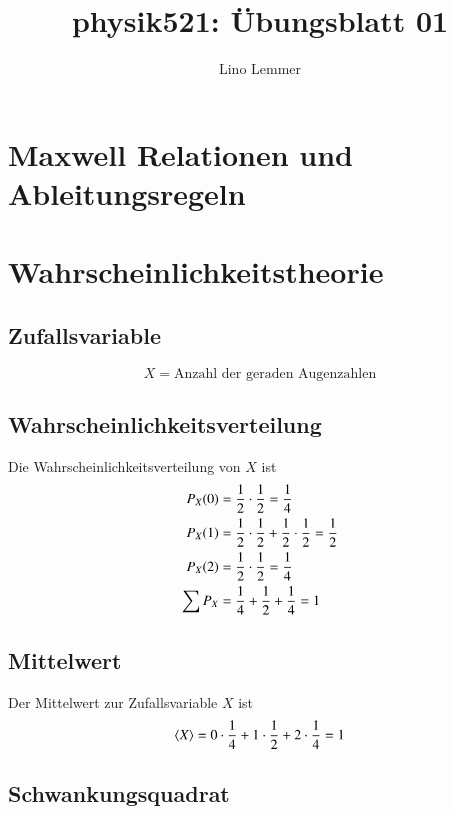 

\setcounter{section}{1}
\renewcommand\thesection{H\,1.\arabic{section}}
\renewcommand\thesubsection{\thesection.\alph{subsection}}

\title{physik521: Übungsblatt 01}
\author{Lino Lemmer}


\maketitle
\section{Maxwell Relationen und Ableitungsregeln}


\section{Wahrscheinlichkeitstheorie}

\subsection{Zufallsvariable}

\[
    X = \text{Anzahl der geraden Augenzahlen}
\]

\subsection{Wahrscheinlichkeitsverteilung}

Die Wahrscheinlichkeitsverteilung von $X$ ist
\begin{align*}
    P_X(0) &= \frac 12\cdot\frac 12 = \frac 14\\
    P_X(1) &= \frac 12\cdot\frac 12 + \frac 12\cdot\frac 12 = \frac 12\\
    P_X(2) &= \frac 12\cdot\frac 12 = \frac 14\\
    \sum P_X &= \frac 14 + \frac 12 + \frac 14 = 1
\end{align*}

\subsection{Mittelwert}

Der Mittelwert zur Zufallsvariable $X$ ist
\[
    \left\langle X\right\rangle = 0\cdot\frac14 + 1\cdot\frac 12 + 2\cdot\frac14 = 1
\]

\subsection{Schwankungsquadrat}

